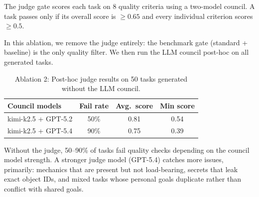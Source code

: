 The judge gate scores each task on 8 quality criteria using a two-model council.
A task passes only if its overall score is $\geq 0.65$ and every individual criterion scores $\geq 0.5$.

In this ablation, we remove the judge entirely: the benchmark gate (standard + baseline) is the only quality filter.
We then run the LLM council post-hoc on all generated tasks.

\begin{table}[h]
\centering
\caption{Ablation 2: Post-hoc judge results on 50 tasks generated without the LLM council.}
\label{tab:ablation_judge}
\begin{tabular}{@{}lccc@{}}
\toprule
\textbf{Council models} & \textbf{Fail rate} & \textbf{Avg.\ score} & \textbf{Min score} \\
\midrule
kimi-k2.5 + GPT-5.2 & 50\% & 0.81 & 0.54 \\
kimi-k2.5 + GPT-5.4 & 90\% & 0.75 & 0.39 \\
\bottomrule
\end{tabular}
\end{table}

Without the judge, 50--90\% of tasks fail quality checks depending on the council model strength.
A stronger judge model (GPT-5.4) catches more issues, primarily: mechanics that are present but not load-bearing, secrets that leak exact object IDs, and mixed tasks whose personal goals duplicate rather than conflict with shared goals.
